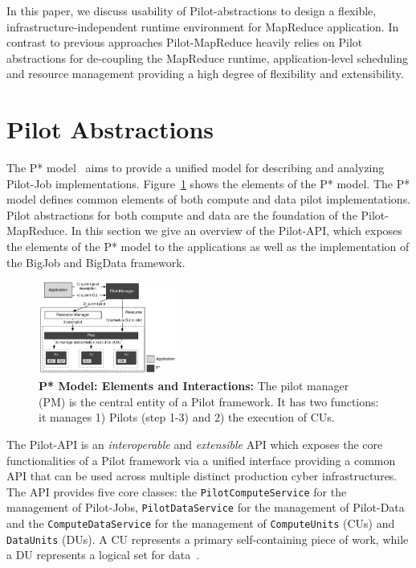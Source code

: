 \documentclass{acm_proc_article-sp}
\newcommand{\jhanote}[1]{ {\textcolor{red} { ***SJ: #1 }}}
\newcommand{\alnote}[1]{ {\textcolor{blue} { ***andreL: #1 }}}
\newcommand{\alnote}[1]{}
\newcommand{\jhanote}[1]{}
\newcommand{\upp}{\vspace*{-0.5em}}
\newcommand{\pilot}{Pilot\xspace}
\newcommand{\pilotjob}{Pilot-Job\xspace}
\newcommand{\pilotmapreduce}{Pilot-MapReduce\xspace}
\newcommand{\cus}{CUs\xspace}
\begin{document}
In this paper, we discuss usability of \pilot-abstractions to design a flexible, 
infrastructure-independent runtime environment for MapReduce application. In 
contrast to previous approaches \pilotmapreduce heavily relies on \pilot 
abstractions for de-coupling the MapReduce runtime, application-level scheduling 
and resource management providing a high degree of flexibility and extensibility.




\upp
\section{Pilot Abstractions}
\label{sec-pilot-impl}



The P* model~\cite{pstar-2012} aims to provide a unified model for describing
and analyzing \pilotjob implementations. Figure~\ref{fig:figures_pstar} shows
the elements of the P* model. The P* model defines common elements of both
compute and data pilot implementations. Pilot abstractions for both compute and
data are the foundation of the \pilotmapreduce. In this section we give an
overview of the Pilot-API, which exposes the elements of the P* model to the
applications as well as the implementation of the BigJob and BigData framework.


\begin{figure}[t]
	\upp\upp
    \centering
    \includegraphics[width=0.4\textwidth]{figures/pstar_model_single.pdf}
    \caption{ \textbf{P* Model: Elements and
        Interactions:} The pilot manager (PM) is the central entity of a \pilot 
     framework. It has two functions: it manages 1) Pilots (step 1-3) and 2) the 
     execution of \cus.}
	\upp\upp
    \label{fig:figures_pstar}
\end{figure}


The Pilot-API is an {\it interoperable} and {\it extensible} API which
exposes the core functionalities of a \pilot framework via a unified
interface providing a common API that can be used across multiple
distinct production cyber infrastructures.  The API provides five
core classes: the \texttt{PilotComputeService} for the management of
Pilot-Jobs, \texttt{PilotDataService} for the management of Pilot-Data
and the \texttt{ComputeDataService} for the management of
\texttt{ComputeUnits} (CUs) and \texttt{DataUnits} (DUs). 
A CU represents a primary self-containing piece of work, while a DU
represents a logical set for data~\cite{pstar-2012}.
\end{document}
